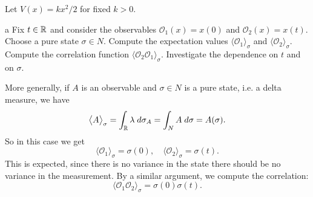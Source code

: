\documentclass{pset}
\begin{document}
\begin{solution}
    Let $V(x) = kx^2 / 2$ for fixed $k > 0$.
    \begin{part}{a}
        Fix $t\in \mathbb{R}$ and consider the observables $\mathcal{O}_1(x)=x(0)$ and $\mathcal{O}_2(x) = x(t)$. Choose a pure state $\sigma \in N$. Compute the expectation values $\big\langle \mathcal{O}_1 \big\rangle_\sigma$ and $\big\langle \mathcal{O}_2 \big\rangle_\sigma$. Compute the correlation function $\big\langle \mathcal{O}_2\mathcal{O}_1 \big\rangle_\sigma$. Investigate the dependence on $t$ and on $\sigma$.
    \end{part}

    \quad More generally, if $A$ is an observable and $\sigma \in N$ is a pure state, i.e. a delta measure, we have
    \[
        \big\langle A \big\rangle_\sigma = \int_{\mathbb{R}} \lambda \;d\sigma_A = \int_N A \;d\sigma = A(\sigma)
    .\] 
    So in this case we get
    \[
        \big\langle \mathcal{O}_1 \big\rangle_\sigma = \sigma(0), \quad \big\langle \mathcal{O}_2 \big\rangle_\sigma = \sigma(t)
    .\] 
    This is expected, since there is no variance in the state there should be no variance in the measurement. By a similar argument, we compute the correlation:
    \[
        \big\langle \mathcal{O}_1\mathcal{O}_2 \big\rangle_\sigma = \sigma(0)\sigma(t)
    .\] 


\end{solution}
\end{document}
